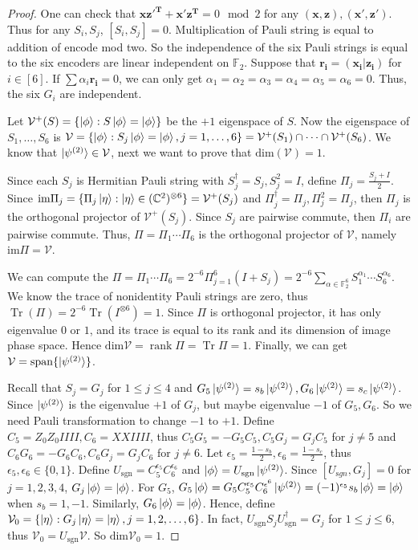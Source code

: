 \begin{proof}
One can check that $\mathbf{xz'^T+x'z^T}=0 \mod{2}$ for any $(\mathbf{x,z}),(\mathbf{x',z'})$. Thus for any $S_i,S_j$, $[S_i,S_j]=0$. Multiplication of Pauli string is equal to addition of encode mod two. So the independence of the six Pauli strings is equal to the six encoders are linear independent on $\mathbb{F}_2$. Suppose that $\mathbf{r_i}=(\mathbf{x_i|z_i})$ for $i\in [6]$. If $\sum \alpha_i \mathbf{r_i}=0$, we can only get $\alpha_1=\alpha_2=\alpha_3=\alpha_4=\alpha_5=\alpha_6=0$. Thus, the six $G_i$ are independent.

Let $\mathcal{V^+}(S)=\{\ket{\phi}:S\ket{\phi}=\ket{\phi}\}$ be the $+1$ eigenspace of $S$. Now the eigenspace of $S_1,\dots,S_6$ is $\mathcal{V}=\{\ket{\phi}:S_j\ket{\phi}=\ket{\phi},j=1,\dots,6\}=\mathcal{V^+}(S_1)\cap\cdots \cap \mathcal{V^+}(S_6)$. We know that $\ket{\psi^{(2)}}\in \mathcal{V}$, next we want to prove that $\mathrm{dim}(\mathcal{V})=1$.

Since each $S_j$ is Hermitian Pauli string with $S_j^\dagger=S_j,S_j^2=I$, define $\Pi_j=\frac{S_j+I}{2}$. Since $\mathrm{im} \Pi_j=\{\Pi_j\ket{\eta}:\ket{\eta}\in (\mathbb{C}^2)^{\otimes 6}\}=\mathcal{V}^+(S_j)$ and $\Pi_j^\dagger=\Pi_j,\Pi_j^2=\Pi_j$, then $\Pi_j$ is the orthogonal projector of $\mathcal{V}^+(S_j)$. Since $S_j$ are pairwise commute, then $\Pi_i$ are pairwise commute. Thus, $\Pi=\Pi_1\cdots\Pi_6$ is the orthogonal projector of $\mathcal{V}$, namely $\mathrm{im} \Pi=\mathcal{V}$.

We can compute the $\Pi=\Pi_1\cdots \Pi_6=2^{-6}\Pi_{j=1}^6(I+S_j)=2^{-6}\sum_{\alpha\in \mathbb{F}_2^{6}}S_1^{\alpha_1}\cdots S_6^{\alpha_6}$. We know the trace of nonidentity Pauli strings are zero, thus $\operatorname{Tr}(\Pi)=2^{-6}\operatorname{Tr}(I^{\otimes 6})=1$. Since $\Pi$ is orthogonal projector, it has only eigenvalue $0$ or $1$, and its trace is equal to its rank and its dimension of image phase space. Hence $\mathrm{dim}\mathcal{V}=\operatorname{rank} \Pi=\operatorname{Tr}\Pi=1$. Finally, we can get $\mathcal{V}=\operatorname{span}\{\ket{\psi^{(2)}}\}$.

Recall that $S_j=G_j$ for $1\leq j\leq 4$ and $G_5\ket{\psi^{(2)}}=s_b\ket{\psi^{(2)}},G_6\ket{\psi^{(2)}}=s_c\ket{\psi^{(2)}}$.
Since $\ket{\psi^{(2)}}$ is the eigenvalue $+1$ of $G_j$, but maybe eigenvalue $-1$ of $G_5,G_6$. So we need Pauli transformation to change $-1$ to $+1$. Define $C_5=Z_0Z_0IIII,C_6=XXIIII$, thus $C_5G_5=-G_5C_5,C_5G_j=G_jC_5$ for $j\neq 5$ and $C_6G_6=-G_6C_6,C_6G_j=G_jC_6$ for $j\neq 6$. Let $\epsilon_5=\frac{1-s_b}{2},\epsilon_6=\frac{1-s_c}{2}$, thus $\epsilon_5,\epsilon_6\in\{0,1\}$. Define $U_{\mathrm{sgn}}=C_5^{\epsilon_5}C_6^{\epsilon_6}$ and $\ket{\phi}=U_{\mathrm{sgn}}\ket{\psi^{(2)}}$. Since $[U_{\mathrm
sgn},G_j]=0$ for $j=1,2,3,4$, $G_j\ket{\phi}=\ket{\phi}$. For $G_5$, $G_5\ket{\phi}=G_5C_5^{\epsilon_5}C_6^{\epsilon^6}\ket{\psi^{(2)}}=(-1)^{\epsilon_5}s_b\ket{\phi}=\ket{\phi}$ when $s_b=1,-1$. Similarly, $G_6\ket{\phi}=\ket{\phi}$. Hence, define $\mathcal{V}_0=\{\ket{\eta}:G_j\ket{\eta}=\ket{\eta},j=1,2,\dots,6\}$. In fact, $U_{\mathrm{sgn}}S_jU_{\mathrm{sgn}}^\dagger=G_j$ for $1\leq j\leq 6$, thus $\mathcal{V}_0=U_{\mathrm{sgn}}\mathcal{V}$. So $\mathrm{dim} \mathcal{V}_0=1$.


\end{proof}
